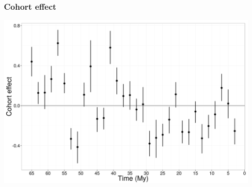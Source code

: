 \documentclass{beamer}
\begin{document}
\begin{frame}
  \frametitle{Cohort effect}
  \begin{center}
    \includegraphics[height = 0.8\textheight, width = \textwidth,  keepaspectratio = true]{figure/cohort_est}
  \end{center}
\end{frame}
\end{document}
